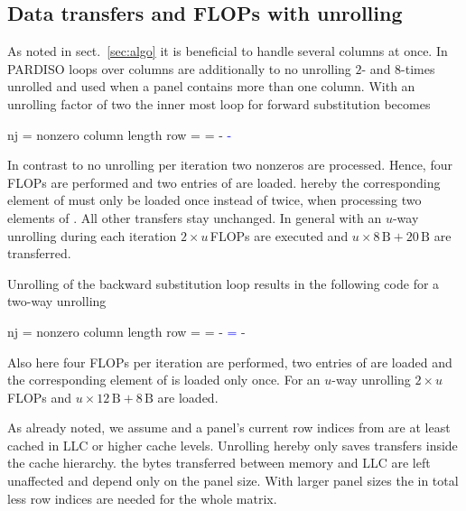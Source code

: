 \subsection{Data transfers and FLOPs with unrolling}
\label{sec:pm:dt:wu}
%
As noted in sect.~\ref{sec:algo} it is beneficial to handle several columns
at once.
In PARDISO loops over columns are additionally to no unrolling $2$- and
$8$-times unrolled and used when a panel contains more than one column. 
With an unrolling factor of two the inner most loop for forward substitution
becomes
%
\begin{algorithmic}[1]
  \State nj = nonzero column length
      \State row = \nindx[i++]
      \State \nr[row] = \nr[row] - \nr[j] \nlnz[k] \textcolor{blue}{- \nr[j+1] \nlnz[k+nj]}
  \EndFor
\end{algorithmic}
%
In contrast to no unrolling per iteration two nonzeros are processed.
Hence, four FLOPs are performed and two entries of \vlnz{} are loaded.
hereby the corresponding element of \vr{} must only be loaded once instead of
twice, when processing two elements of \vlnz{}.
All other transfers stay unchanged.
%
In general with an $u$-way unrolling during each iteration $2 \times u$\,FLOPs
are executed and $u \times 8\,\text{B} + 20\,\text{B}$ are transferred.

Unrolling of the backward substitution loop results in the following code for a
two-way unrolling
%
\begin{algorithmic}[1]
  \State nj = nonzero column length
      \State row = \nindx[i++]
      \State \nr[j]   = \nr[j] - \nlnz[k] \nr[row]
      \State \textcolor{blue}{\nr[j+1]   = \nr[j+1] - \nlnz[k+nj] \nr[row]}
  \EndFor
\end{algorithmic}
%
Also here four FLOPs per iteration are performed, two entries of \vlnz{} are
loaded and the corresponding element of \vr{} is loaded only once.
%
For an $u$-way unrolling $2 \times u$\,FLOPs and $u \times 12\,\text{B} +
8\,\text{B}$ are loaded.

As already noted, we assume \vr{} and a panel's current row indices from
\vindx{} are at least cached in LLC or higher cache levels.
%
Unrolling hereby only saves transfers inside the cache hierarchy.
the bytes transferred between memory and LLC are left unaffected and depend only
on the panel size.
With larger panel sizes the in total less row indices \vindx{} are needed for the
whole matrix. 

